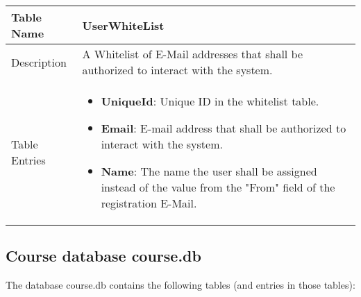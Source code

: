 \begin{tabular}{|p{3cm}|p{10cm}|}
\hline
Table Name & UserWhiteList \\
\hline
Description & A Whitelist of E-Mail addresses that shall be authorized to interact with the system.\\
\hline
Table Entries & \begin{itemize}
        \item {\bf UniqueId}: Unique ID in the whitelist table.
        \item {\bf Email}: E-mail address that shall be authorized to interact with the system.
        \item {\bf Name}: The name the user shall be assigned instead of the value from the
            "From" field of the registration E-Mail.
        \end{itemize} \\
\hline
\end{tabular}

\newpage

\subsection{Course database course.db} \label{app:course.db}

The database course.db contains the following tables (and entries in those tables):

